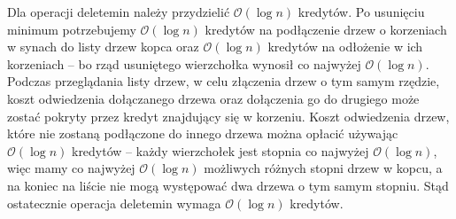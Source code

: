 \documentclass{article}
\begin{document}
Dla operacji deletemin należy przydzielić $\mathcal{O}(\log{n})$ kredytów. Po usunięciu minimum potrzebujemy $\mathcal{O}(\log{n})$ kredytów na podłączenie drzew o korzeniach w synach do listy drzew kopca oraz $\mathcal{O}(\log{n})$ kredytów na odłożenie w ich korzeniach -- bo rząd usuniętego wierzchołka wynosił co najwyżej $\mathcal{O}(\log{n})$. Podczas przeglądania listy drzew, w celu złączenia drzew o tym samym rzędzie, koszt odwiedzenia dołączanego drzewa oraz dołączenia go do drugiego może zostać pokryty przez kredyt znajdujący się w korzeniu. Koszt odwiedzenia drzew, które nie zostaną podłączone do innego drzewa można opłacić używając $\mathcal{O}(\log{n})$ kredytów -- każdy wierzchołek jest stopnia co najwyżej $\mathcal{O}(\log{n})$, więc mamy co najwyżej $\mathcal{O}(\log{n})$ możliwych różnych stopni drzew w kopcu, a na koniec na liście nie mogą występować dwa drzewa o tym samym stopniu. Stąd ostatecznie operacja deletemin wymaga $\mathcal{O}(\log{n})$ kredytów.
\end{document}
